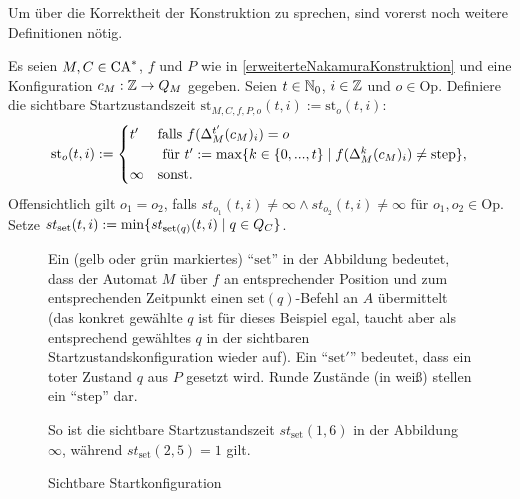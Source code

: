 Um über die Korrektheit der Konstruktion zu sprechen, sind vorerst noch weitere Definitionen nötig.

\begin{definition}
    Es seien $M, C \in \textrm{CA}^*$, $f$ und $P$ wie in \cref{erweiterteNakamuraKonstruktion} und eine Konfiguration $c_M: \mathbb{Z} \to Q_M$ gegeben.
    Seien $t \in \mathbb{N}_0$, $i \in \mathbb{Z}$ und $o \in \mathrm{Op}$.
    Definiere die sichtbare Startzustandszeit $\mathrm{st}_{M, C, f, P, o}(t, i) := \mathrm{st}_o(t, i)$:
    \[
        \mathrm{st}_o(t, i) :=
        \begin{cases}
            t' &
                \text{falls } f(\Delta_M^{t'}(c_M)_i) = o \\
                & \text{ für } t' := \max \{ { k \in \{ {0, ..., t} \} } \; | \; { f(\Delta_M^{k}(c_M)_i) \neq \mathrm{step} } \},
            \\
            \infty & \text{sonst.}
        \end{cases}
    \]
    Offensichtlich gilt $o_1 = o_2$, falls $st_{o_1}(t, i) \neq \infty \land st_{o_2}(t, i) \neq \infty$ für $o_1, o_2 \in \mathrm{Op}$.
    Setze $st_{\mathrm{set}}(t, i) := \min \{ { st_{\mathrm{set}(q)}(t, i)} \; | \; { q \in Q_C } \}$.
    
    \newcommand{\setq}{\scriptsize $\mathrm{set}$}
    \newcommand{\setp}{\scriptsize $\mathrm{set}'$}
    
    \begin{figure}[h!]
        \begin{center}
        
        \end{center}
        \caption{Sichtbare Startkonfiguration}
        \label{fig:SichtbareStartkonfiguration}
        
        Ein (gelb oder grün markiertes) \enquote{$\mathrm{set}$} in der Abbildung bedeutet,
        dass der Automat $M$ über $f$ an entsprechender Position und zum entsprechenden Zeitpunkt
        einen $\mathrm{set}(q)$-Befehl an $A$ übermittelt (das konkret gewählte $q$ ist für dieses Beispiel egal, taucht aber als entsprechend gewähltes $q$ in der sichtbaren Startzustandskonfiguration wieder auf).
        Ein \enquote{$\mathrm{set}'$} bedeutet, dass ein toter Zustand $q$ aus $P$ gesetzt wird.
        Runde Zustände (in weiß) stellen ein \enquote{$\mathrm{step}$} dar.
        
        So ist die sichtbare Startzustandszeit $st_{\mathrm{set}}(1, 6)$ in der Abbildung $\infty$,
        während $st_{\mathrm{set}}(2, 5) = 1$ gilt.
        

\end{figure}
\end{definition}
